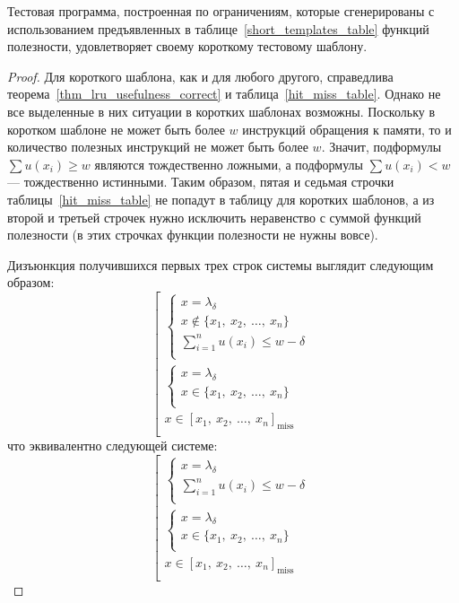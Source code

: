 \begin{theorem}\label{short_templates}
Тестовая программа, построенная по ограничениям, которые
сгенерированы с использованием предъявленных в
таблице~\ref{short_templates_table} функций полезности,
удовлетворяет своему короткому тестовому шаблону.
\end{theorem}
\begin{proof}
  Для короткого шаблона, как и для любого другого, справедлива
  теорема~\ref{thm_lru_usefulness_correct} и
  таблица~\ref{hit_miss_table}. Однако не все выделенные в них
  ситуации в коротких шаблонах возможны. Поскольку в коротком
  шаблоне не может быть более $w$ инструкций обращения к памяти, то
  и количество полезных инструкций не может быть более $w$. Значит,
  подформулы $\sum u(x_i) \geqslant w$ являются тождественно
  ложными, а подформулы $\sum u(x_i) < w$ --- тождественно
  истинными. Таким образом, пятая и седьмая строчки
  таблицы~\ref{hit_miss_table} не попадут в таблицу для коротких
  шаблонов, а из второй и третьей строчек нужно исключить
  неравенство с суммой функций полезности (в этих строчках функции
  полезности не нужны вовсе).

  Дизъюнкция получившихся первых трех строк системы выглядит следующим образом:
  $$\left[\begin{array}{l}
        \left\{\begin{array}{l}
            x = \lambda_\delta\\
            x \notin \{x_1,~x_2,~\dots,~x_n\}\\
            \sum_{i=1}^n u(x_i) \leqslant w - \delta\\
        \end{array}\right.\\[1cm]
        \left\{\begin{array}{l}
            x = \lambda_\delta\\
            x \in \{x_1,~x_2,~\dots,~x_n\}\\
        \end{array}\right.\\
        x \in [x_1,~x_2,~\dots,~x_n]_{\mbox{miss}}\\
    \end{array}\right.$$
    что эквивалентно следующей системе:
  $$\left[\begin{array}{l}
        \left\{\begin{array}{l}
            x = \lambda_\delta\\
            \sum_{i=1}^n u(x_i) \leqslant w - \delta\\
        \end{array}\right.\\[1cm]
        \left\{\begin{array}{l}
            x = \lambda_\delta\\
            x \in \{x_1,~x_2,~\dots,~x_n\}\\
        \end{array}\right.\\
        x \in [x_1,~x_2,~\dots,~x_n]_{\mbox{miss}}\\
    \end{array}\right.$$


\end{proof}
